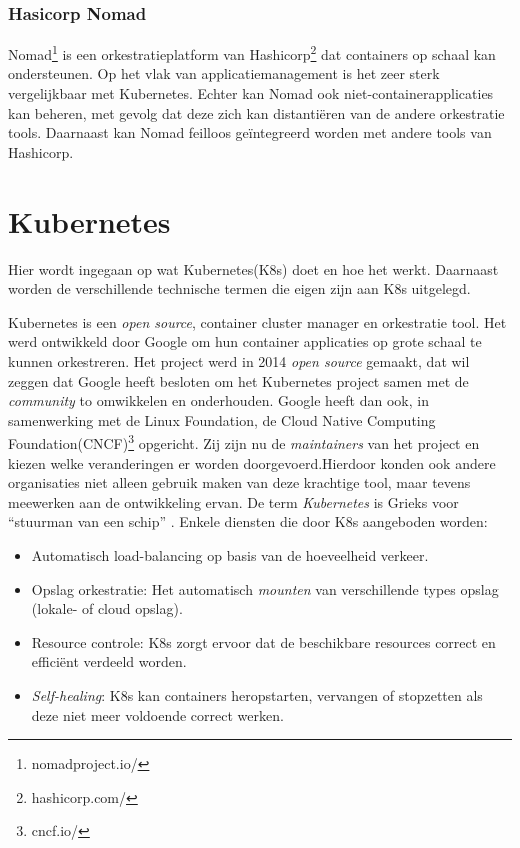 \subsubsection{Hasicorp Nomad}
Nomad\footnote{nomadproject.io/} is een orkestratieplatform van Hashicorp\footnote{hashicorp.com/} dat containers op schaal kan ondersteunen. Op het vlak van applicatiemanagement is het zeer sterk vergelijkbaar met Kubernetes. Echter kan Nomad ook niet-containerapplicaties kan beheren, met gevolg dat deze zich kan distantiëren van de andere orkestratie tools. Daarnaast kan Nomad feilloos geïntegreerd worden met andere tools van Hashicorp.

\section{Kubernetes}
Hier wordt ingegaan op wat Kubernetes(K8s) doet en hoe het werkt. Daarnaast worden de verschillende technische termen die eigen zijn aan K8s uitgelegd.

Kubernetes is een \textit{open source}, container cluster manager en orkestratie tool. Het werd ontwikkeld door Google om hun container applicaties op grote schaal te kunnen orkestreren. Het project werd in 2014 \textit{open source} gemaakt, dat wil zeggen dat Google heeft besloten om het Kubernetes project samen met de \textit{community} to omwikkelen en onderhouden. Google heeft dan ook, in samenwerking met de Linux Foundation, de Cloud Native Computing Foundation(CNCF)\footnote{cncf.io/} opgericht. Zij zijn nu de \textit{maintainers} van het project en kiezen welke veranderingen er worden doorgevoerd.Hierdoor konden ook andere organisaties niet alleen gebruik maken van deze krachtige tool, maar tevens meewerken aan de ontwikkeling ervan. De term \textit{Kubernetes} is Grieks voor ``stuurman van een schip'' \autocite{Kubernetes2021}. Enkele diensten die door K8s aangeboden worden:
\begin{itemize}
    \item Automatisch load-balancing op basis van de hoeveelheid verkeer.
    \item Opslag orkestratie: Het automatisch \textit{mounten} van verschillende types opslag (lokale- of cloud opslag).
    \item Resource controle: K8s zorgt ervoor dat de beschikbare resources correct en efficiënt verdeeld worden.
    \item \textit{Self-healing}: K8s kan containers heropstarten, vervangen of stopzetten als deze niet meer voldoende correct werken.
\end{itemize}

